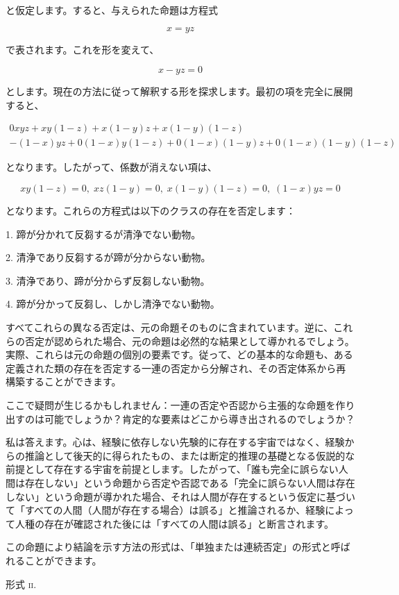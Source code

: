 \documentclass[a4paper,11pt,openany]{ltjsbook}
\begin{document}
と仮定します。すると、与えられた命題は方程式

\[
x = yz
\]

で表されます。これを形を変えて、

\[
x - yz = 0
\]

とします。現在の方法に従って解釈する形を探求します。最初の項を完全に展開すると、

\begin{eqnarray*}
0xyz + xy(1-z) + x(1-y)z + x(1-y)(1-z)\\
- (1-x)yz + 0(1-x)y(1-z) + 0(1-x)(1-y)z + 0(1-x)(1-y)(1-z)
\end{eqnarray*}

となります。したがって、係数が消えない項は、

\[
xy(1-z) = 0,\; xz(1-y) = 0,\; x(1-y)(1-z) = 0,\; (1-x)yz = 0
\]

となります。これらの方程式は以下のクラスの存在を否定します：

1. 蹄が分かれて反芻するが清浄でない動物。

2. 清浄であり反芻するが蹄が分からない動物。

3. 清浄であり、蹄が分からず反芻しない動物。

4. 蹄が分かって反芻し、しかし清浄でない動物。

すべてこれらの異なる否定は、元の命題そのものに含まれています。逆に、これらの否定が認められた場合、元の命題は必然的な結果として導かれるでしょう。実際、これらは元の命題の個別の要素です。従って、どの基本的な命題も、ある定義された類の存在を否定する一連の否定から分解され、その否定体系から再構築することができます。

ここで疑問が生じるかもしれません：一連の否定や否認から主張的な命題を作り出すのは可能でしょうか？肯定的な要素はどこから導き出されるのでしょうか？

私は答えます。心は、経験に依存しない先験的に存在する宇宙ではなく、経験からの推論として後天的に得られたもの、または断定的推理の基礎となる仮説的な前提として存在する宇宙を前提とします。したがって、「誰も完全に誤らない人間は存在しない」という命題から否定や否認である「完全に誤らない人間は存在しない」という命題が導かれた場合、それは人間が存在するという仮定に基づいて「すべての人間（人間が存在する場合）は誤る」と推論されるか、経験によって人種の存在が確認された後には「すべての人間は誤る」と断言されます。

この命題により結論を示す方法の形式は、「単独または連続否定」の形式と呼ばれることができます。

\begin{center}
\textsc{形式 ii}.
\end{center}
\end{document}
